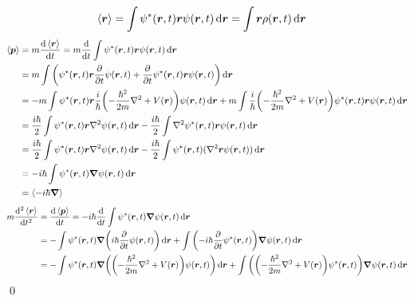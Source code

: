 \documentclass[uplatex,dvipdfmx,a4paper,11pt]{jlreq}
\makeatletter
\newcommand{\rr}{\bm{r}}
\newcommand{\pp}{\bm{p}}
\theoremstyle{definition}
\renewenvironment{proof}[1][\proofname]{\par
  \normalfont
  \topsep6\p@\@plus6\p@ \trivlist
  \item[\hskip\labelsep{\bfseries #1}\@addpunct{\bfseries}]\ignorespaces\quad\par
}{%
  \qed\endtrivlist\@endpefalse
}
\renewcommand\proofname{証明}
\makeatother
\begin{document}
\begin{proof}
  \begin{align}
    \ev{\rr} & = \int\psi^*(\rr, t)\rr\psi(\rr, t)\dd{\rr} = \int\rr\rho(\rr, t)\dd{\rr}
  \end{align}
  \begin{align}
    \ev{\pp} & = m\dv{\ev{\rr}}{t} = m\dv{t}\int\psi^*(\rr, t)\rr\psi(\rr, t)\dd{\rr}                                                                                                                                       \\
             & = m\int\qty(\psi^*(\rr, t)\rr\pdv{t}\psi(\rr, t) + \pdv{t}\psi^*(\rr, t)\rr\psi(\rr, t))\dd{\rr}                                                                                                             \\
             & = -m\int\psi^*(\rr, t)\rr\frac{i}{\hbar}\qty(-\frac{\hbar^2}{2m}\nabla^2 + V(\rr))\psi(\rr, t)\dd{\rr} + m\int\frac{i}{\hbar}\qty(-\frac{\hbar^2}{2m}\nabla^2 + V(\rr))\psi^*(\rr, t)\rr\psi(\rr, t)\dd{\rr} \\
             & = \frac{i\hbar}{2}\int\psi^*(\rr, t)\rr\nabla^2\psi(\rr, t)\dd{\rr} - \frac{i\hbar}{2}\int\nabla^2\psi^*(\rr, t)\rr\psi(\rr, t)\dd{\rr}                                                                      \\
             & = \frac{i\hbar}{2}\int\psi^*(\rr, t)\rr\nabla^2\psi(\rr, t)\dd{\rr} - \frac{i\hbar}{2}\int\psi^*(\rr, t)(\nabla^2\rr\psi(\rr, t))\dd{\rr}                                                                    \\
             & = -i\hbar\int\psi^*(\rr, t)\vnabla\psi(\rr, t)\dd{\rr}                                                                                                                                                       \\
             & = \ev{-i\hbar\vnabla}
  \end{align}
  \begin{align}
    m\dv[2]{\ev{\rr}}{t} & = \dv{\ev{\pp}}{t} = -i\hbar\dv{t}\int\psi^*(\rr, t)\vnabla\psi(\rr, t)\dd{\rr}                                                                                                                  \\
                         & = -\int\psi^*(\rr, t)\vnabla\qty(i\hbar\pdv{t}\psi(\rr, t))\dd{\rr} + \int\qty(-i\hbar\pdv{t}\psi^*(\rr, t))\vnabla\psi(\rr, t)\dd{\rr}                                                          \\
                         & = -\int\psi^*(\rr, t)\vnabla\qty(\qty(-\frac{\hbar^2}{2m}\nabla^2 + V(\rr))\psi(\rr, t))\dd{\rr} + \int\qty(\qty(-\frac{\hbar^2}{2m}\nabla^2 + V(\rr))\psi^*(\rr, t))\vnabla\psi(\rr, t)\dd{\rr} \\

\end{align}
\end{proof}
\end{document}
